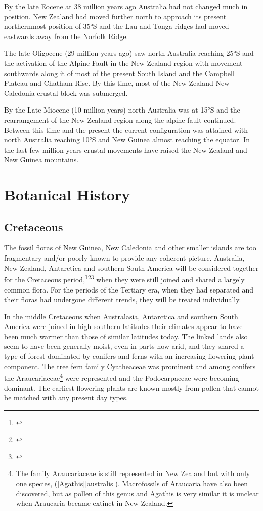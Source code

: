 By the late Eocene at 38 million years ago Australia had not changed much in position.
New Zealand had moved further north to approach its present northernmost position of \ang{35}S and the Lau and Tonga ridges had moved eastwards away from the Norfolk Ridge.

The late Oligocene (29 million years ago) saw north Australia reaching \ang{25}S and the activation of the Alpine Fault in the New Zealand region with movement southwards along it of most of the present South Island and the Campbell Plateau and Chatham Rise.
By this time, most of the New Zealand-New Caledonia crustal block was submerged.

By the Late Miocene (10 million years) north Australia was at \ang{15}S and the rearrangement of the New Zealand region along the alpine fault continued.
Between this time and the present the current configuration was attained with north Australia reaching \ang{10}S and New Guinea almost reaching the equator.
In the last few million years crustal movements have raised the New Zealand and New Guinea mountains.

\section{Botanical History}

\subsection{Cretaceous}

The fossil floras of New Guinea, New Caledonia and other smaller islands are too fragmentary and/or poorly known to provide any coherent picture.
Australia, New Zealand, Antarctica and southern South America will be considered together for the Cretaceous period,\footnote{\cite{mildenhall1980new}}\footnote{\cite{wace1965vascular}}\footnote{\cite{dettmann1981cretaceous}} when they were still joined and shared a largely common flora.
For the periods of the Tertiary era, when they had separated and their floras had undergone different trends, they will be treated individually.

In the middle Cretaceous when Australasia, Antarctica and southern South America were joined in high southern latitudes their climates appear to have been much warmer than those of similar latitudes today.
The linked lands also seem to have been generally moist, even in parts now arid, and they shared a type of forest dominated by conifers and ferns with an increasing flowering plant component.
The tree fern family Cyatheaceae was prominent and among conifers the Araucariaceae\footnote{The family Araucariaceae is still represented in New Zealand but with only one species,  ([Agathis][australis]). Macrofossils of Araucaria have also been discovered, but as pollen of this genus and Agathis is very similar it is unclear when Araucaria became extinct in New Zealand.} were represented and the Podocarpaceae were becoming dominant.
The earliest flowering plants are known mostly from pollen that cannot be matched with any present day types.


